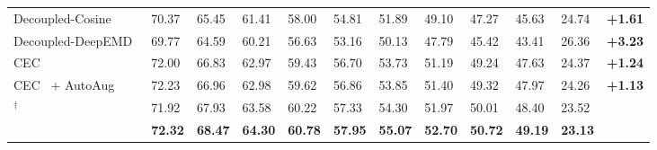 \begin{table*}[t]
{{\begin{tabular}{llllllllllll}
				Decoupled-Cosine~\cite{vinyals2016matching}  & 70.37  & 65.45      & 61.41     & 58.00  & 54.81   & 51.89  & 49.10   & 47.27     & 45.63    & 24.74 & \bf +1.61   \\
				Decoupled-DeepEMD~\cite{zhang2020deepemd}    & 69.77   & 64.59     & 60.21    & 56.63  & 53.16   & 50.13  & 47.79  & 45.42     & 43.41    & 26.36   & \bf +3.23   \\
				CEC~\cite{zhang2021few}                    & 72.00   & 66.83     & 62.97   & 59.43  & 56.70   &53.73  & 51.19   & 49.24     & 47.63   & 24.37   & \bf +1.24     \\
				CEC~\cite{zhang2021few} + AutoAug                    & 72.23   & 66.96     & 62.98   & 59.62  & 56.86   &53.85  & 51.40   & 49.32     & 47.97   & 24.26   & \bf +1.13     \\
				\midrule
				\mame$^\dagger$                & 71.92   & 67.93     & 63.58   & 60.22  & 57.33   &54.30  & 51.97   & 50.01     & 48.40   & 23.52   &     \\
				\name              & \bf 72.32   & \bf 68.47     & \bf64.30    & \bf60.78  & \bf57.95   &\bf55.07  & \bf52.70  &\bf 50.72     & \bf 49.19   & \bf23.13   &   \\
				\bottomrule
				
			\end{tabular}
	}}
\end{table*}


